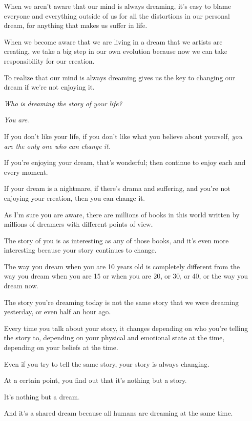 \documentclass{article}
\numberwithin{equation}{section}
\begin{document}
%
When we aren't aware that our mind is always dreaming, it's easy to blame everyone and everything outside of us for all the distortions in our personal dream, for anything that makes us suffer in life.

When we become aware that we are living in a dream that we artists are creating, we take a big step in our own evolution because now we can take responsibility for our creation.

To realize that our mind is always dreaming gives us the key to changing our dream if we're not enjoying it.

%
\textit{Who is dreaming the story of your life?}

\textit{You are}.

If you don't like your life, if you don't like what you believe about yourself, \textit{you are the only one who can change it}.

If you're enjoying your dream, that's wonderful; then continue to enjoy each and every moment.

If your dream is a nightmare, if there's drama and suffering, and you're not enjoying your creation, then you can change it.

As I'm sure you are aware, there are millions of books in this world written by millions of dreamers with different points of view.

The story of you is as interesting as any of those books, and it's even more interesting because your story continues to change.

The way you dream when you are 10 years old is completely different from the way you dream when you are 15 or when you are 20, or 30, or 40, or the way you dream now.

%
The story you're dreaming today is not the same story that we were dreaming yesterday, or even half an hour ago.

Every time you talk about your story, it changes depending on who you're telling the story to, depending on your physical and emotional state at the time, depending on your beliefs at the time.

Even if you try to tell the same story, your story is always changing.

At a certain point, you find out that it's nothing but a story.


It's nothing but a dream.

And it's a shared dream because all humans are dreaming at the same time.
\end{document}
